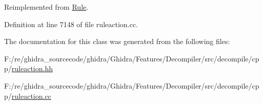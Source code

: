 Reimplemented from \mbox{\hyperlink{class_rule_a4023bfc7825de0ab866790551856d10e}{Rule}}.



Definition at line 7148 of file ruleaction.\+cc.



The documentation for this class was generated from the following files\+:\begin{DoxyCompactItemize}
\item 
F\+:/re/ghidra\+\_\+sourcecode/ghidra/\+Ghidra/\+Features/\+Decompiler/src/decompile/cpp/\mbox{\hyperlink{ruleaction_8hh}{ruleaction.\+hh}}\item 
F\+:/re/ghidra\+\_\+sourcecode/ghidra/\+Ghidra/\+Features/\+Decompiler/src/decompile/cpp/\mbox{\hyperlink{ruleaction_8cc}{ruleaction.\+cc}}\end{DoxyCompactItemize}
